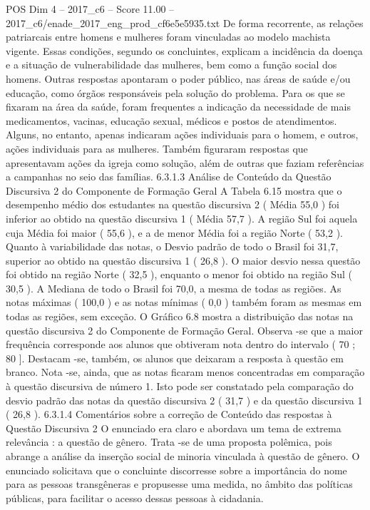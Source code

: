 \begin{textsample}{POS Dim 4 – 2017\_c6 – Score 11.00 – 2017\_c6/enade\_2017\_eng\_prod\_cf6e5e5935.txt}
De forma recorrente, as relações patriarcais entre homens e mulheres foram vinculadas ao modelo machista vigente.
Essas condições, segundo os concluintes, explicam a incidência da doença e a situação de vulnerabilidade das mulheres, bem como a função social dos homens.
Outras respostas apontaram o poder público, nas áreas de saúde e/ou educação, como órgãos responsáveis pela solução do problema.
Para os que se fixaram na área da saúde, foram frequentes a indicação da necessidade de mais medicamentos, vacinas, educação sexual, médicos e postos de atendimentos.
Alguns, no entanto, apenas indicaram ações individuais para o homem, e outros, ações individuais para as mulheres.
Também figuraram respostas que apresentavam ações da igreja como solução, além de outras que faziam referências a campanhas no seio das famílias. 6.3.1.3 Análise de Conteúdo da Questão Discursiva 2 do Componente de Formação Geral A Tabela 6.15 mostra que o desempenho médio dos estudantes na questão discursiva 2 ( Média 55,0 ) foi inferior ao obtido na questão discursiva 1 ( Média 57,7 ).
A região Sul foi aquela cuja Média foi maior ( 55,6 ), e a de menor Média foi a região Norte ( 53,2 ).
Quanto à variabilidade das notas, o Desvio padrão de todo o Brasil foi 31,7, superior ao obtido na questão discursiva 1 ( 26,8 ).
O maior desvio nessa questão foi obtido na região Norte ( 32,5 ), enquanto o menor foi obtido na região Sul ( 30,5 ).
A Mediana de todo o Brasil foi 70,0, a mesma de todas as regiões.
As notas máximas ( 100,0 ) e as notas mínimas ( 0,0 ) também foram as mesmas em todas as regiões, sem exceção.
O Gráfico 6.8 mostra a distribuição das notas na questão discursiva 2 do Componente de Formação Geral.
Observa -se que a maior frequência corresponde aos alunos que obtiveram nota dentro do intervalo ( 70 ; 80 ].
Destacam -se, também, os alunos que deixaram a resposta à questão em branco.
Nota -se, ainda, que as notas ficaram menos concentradas em comparação à questão discursiva de número 1.
Isto pode ser constatado pela comparação do desvio padrão das notas da questão discursiva 2 ( 31,7 ) e da questão discursiva 1 ( 26,8 ). 6.3.1.4 Comentários sobre a correção de Conteúdo das respostas à Questão Discursiva 2 O enunciado era claro e abordava um tema de extrema relevância : a questão de gênero.
Trata -se de uma proposta polêmica, pois abrange a análise da inserção social de minoria vinculada à questão de gênero.
O enunciado solicitava que o concluinte discorresse sobre a importância do nome para as pessoas transgêneras e propusesse uma medida, no âmbito das políticas públicas, para facilitar o acesso dessas pessoas à cidadania.

\end{textsample}
